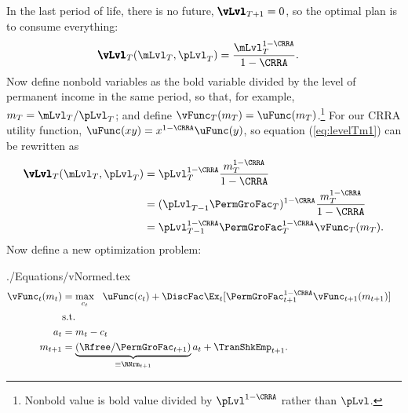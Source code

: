 \documentclass[titlepage, headings=optiontotocandhead]{\econtex}
\begin{document}
In the last period of life, there is no
future, ${\pmb{\vLvl}}
_{T+1} = 0$, so
the optimal plan is to consume everything:
\begin{equation}\begin{gathered}\begin{aligned}
      {\pmb{\vLvl}}
_{T}(\mLvl_{T},\pLvl_{T})  & = \frac{\mLvl_{T}^{1-\CRRA}}{1-\CRRA}. \label{eq:levelTm1}
    \end{aligned}\end{gathered}\end{equation}
Now define nonbold variables as the bold variable divided by
the level of permanent income in the same period, so that, for
example, ${m}_{T}=\mLvl_{T}/\pLvl_{T}$; and define
$\vFunc_{T}({m}_{T}) = \uFunc({m}_{T})$.\footnote{Nonbold value is bold value divided by $\pLvl^{1-\CRRA}$ rather than $\pLvl$.}  For our CRRA utility function, $\uFunc(xy)=x^{1-\CRRA}\uFunc(y)$, so equation (\ref{eq:levelTm1}) can be
rewritten as
\begin{equation*}\begin{gathered}\begin{aligned}
      {\pmb{\vLvl}}
      _{T}(\mLvl_{T},\pLvl_{T})  & = \pLvl_{T}^{1-\CRRA}\frac{{m}_{T}^{1-\CRRA}}{1-\CRRA}
      \\ &      = (\pLvl_{T-1}\PermGroFac_{T})^{1-\CRRA}\frac{{m}_{T}^{1-\CRRA}}{1-\CRRA}
      \\ &= \pLvl_{T-1}^{1-\CRRA}\PermGroFac_{T}^{1-\CRRA}\vFunc_{T}({m}_{T}).
    \end{aligned}\end{gathered}\end{equation*}
Now define a new optimization problem:
\begin{verbatimwrite}{./Equations/vNormed.tex}
  \begin{equation}\begin{gathered}\begin{aligned}
        \null{\vFunc}_{t}({m}_{t})  & = \max_{{c}_{t}} ~~ \uFunc({c}_{t})+
        {\DiscFac}\Ex_{t}[ \PermGroFac_{t+1}^{1-\CRRA}\null{\vFunc}_{t+1}({m}_{t+1})] \label{vtNorm}
        \\         & \text{s.t.} &   \\
        {a}_{t}    & = {m}_{t}-{c}_{t} 
        \\      {m}_{t+1}  & = \underbrace{\left(\Rfree/\PermGroFac_{t+1}\right)}_{\equiv \RNrm_{t+1}}{a}_{t}+\TranShkEmp_{t+1} .
      \end{aligned}\end{gathered}\end{equation}
\end{verbatimwrite}
\end{document}
